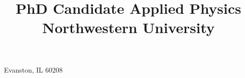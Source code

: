 \usepackage{textcomp}

\usepackage[margin=0.75in]{geometry}


\makeatletter %
\makeatother  %



\setlength{\hintscolumnwidth}{2.2cm}


\title{
	PhD Candidate\texorpdfstring{\newline}{}
    Applied Physics \texorpdfstring{\newline}{}
    Northwestern University
}

\address{2145 Sheridan Rd, F222}{Evanston, IL 60208}


\usepackage{multibib} %



